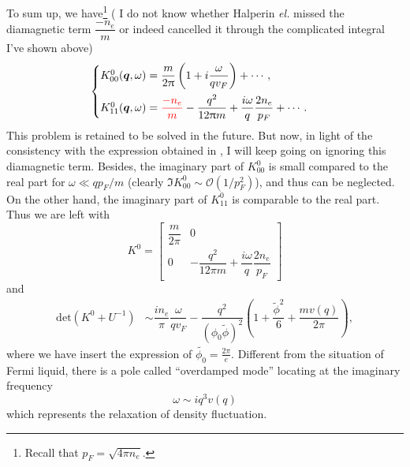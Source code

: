 \documentclass[bachelor,english,numbers]{ustcthesis}
\begin{document}
		\indent To sum up, we have\footnote{Recall that $p_F=\sqrt{4\pi n_e}$.} ({\color{red} I do not know whether Halperin {\it el.} missed the diamagnetic term $\dfrac{-n_e}{m}$ or indeed cancelled it through the complicated integral I've shown above})
		\begin{equation}\label{3.2.13}
			\begin{cases}
				K^0_{00}(\bm{q},\omega)=\dfrac{m}{2\uppi}\left(1+i\dfrac{\omega}{qv_F}\right)+\cdots,\\[1em]
				K^0_{11}(\bm{q},\omega)={\color{red}\dfrac{-n_e}{m}}-\dfrac{q^2}{12\uppi m}+\dfrac{i\omega}{q}\dfrac{2n_e}{p_F}+\cdots.
			\end{cases}
		\end{equation}
		This problem is retained to be solved in the future. But now, in light of the consistency with the expression obtained in \cite{Halperin1995Theory}, I will keep going on ignoring this diamagnetic term. Besides, the imaginary part of $K^0_{00}$ is small compared to the real part for $\omega\ll qp_F/m$ (clearly $\Im K^0_{00}\sim\mathcal{O}(1/p_F^2)$), and thus can be neglected. On the other hand, the imaginary part of $K^0_{11}$ is comparable to the real part. Thus we are left with
		\begin{equation}\label{3.2.14}
			K^0=\left[\begin{array}{cc}
				\dfrac{m}{2\pi} & 0 \\
				0 & -\dfrac{q^2}{12\pi m}+\dfrac{i\omega}{q}\dfrac{2n_e}{p_F}
			\end{array}\right]
		\end{equation}
		and 
		\begin{align*}
			\mathrm{det}(K^0+U^{-1})&\sim\dfrac{in_e}{\pi}\dfrac{\omega}{qv_F}-\dfrac{q^2}{(\phi_0 \widetilde{\phi} )^2}\left(1+\dfrac{\widetilde{\phi}^2 }{6}+\dfrac{mv(q)}{2\pi}\right),
		\end{align*}
		where we have insert the expression of $\widetilde{\phi_0}=\frac{2\pi}{e}$. Different from the situation of Fermi liquid, there is a pole called ``overdamped mode'' locating at the imaginary frequency
		\begin{equation}\label{3.2.15}
			\omega\sim iq^3v(q)
		\end{equation}
		which represents the relaxation of density fluctuation.
\end{document}
